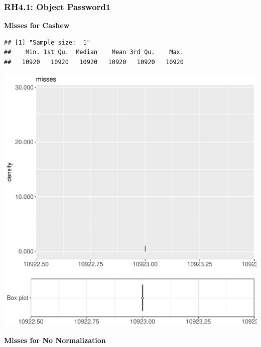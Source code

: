 \documentclass{article}\usepackage[]{graphicx}\usepackage[]{color}
\makeatletter
\def\maxwidth{ %
  \ifdim\Gin@nat@width>\linewidth
    \linewidth
  \else
    \Gin@nat@width
  \fi
}
\newenvironment{kframe}{%
 \def\at@end@of@kframe{}%
 \ifinner\ifhmode%
  \def\at@end@of@kframe{\end{minipage}}%
  \begin{minipage}{\columnwidth}%
 \fi\fi%
 \def\FrameCommand##1{\hskip\@totalleftmargin \hskip-\fboxsep
 \colorbox{shadecolor}{##1}\hskip-\fboxsep
     \hskip-\linewidth \hskip-\@totalleftmargin \hskip\columnwidth}%
 \MakeFramed {\advance\hsize-\width
   \@totalleftmargin\z@ \linewidth\hsize
   \@setminipage}}%
 {\par\unskip\endMakeFramed%
 \at@end@of@kframe}
\newenvironment{knitrout}{}{} %
\makeatother
\begin{document}
\subsubsection{RH4.1: Object Password1}

 \textbf{Misses for Cashew}
\begin{knitrout}
\color{fgcolor}\begin{kframe}
\begin{verbatim}
## [1] "Sample size:  1"
##    Min. 1st Qu.  Median    Mean 3rd Qu.    Max. 
##   10920   10920   10920   10920   10920   10920
\end{verbatim}


{\ttfamily\noindent\bfseries{}}\end{kframe}
\includegraphics[width=\maxwidth]{figure/RH4_cashew_password-1} 

\end{knitrout}
 \textbf{Misses for No Normalization}
\end{document}

